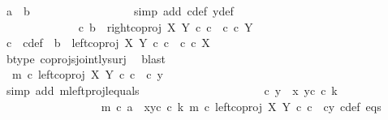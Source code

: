 \begin{isabellebody}
\ {\isachardoublequoteopen}a\ {\isacharequal}{\kern0pt}\ b{\isachardoublequoteclose}\isanewline
\ \ \ \ \ \ \ \ \ \ \ \ \ \ \ \ \isamarkupfalse%
\ {\isacharparenleft}{\kern0pt}simp\ add{\isacharcolon}{\kern0pt}\ c{\isacharunderscore}{\kern0pt}def\ y{\isacharunderscore}{\kern0pt}def{\isacharparenright}{\kern0pt}\isanewline
\ \ \ \ \ \ \ \ \ \ \isamarkupfalse%
\isanewline
\ \ \ \ \ \ \ \ \isamarkupfalse%
\isanewline
\ \ \ \ \ \ \ \ \ \ \ \ \isamarkupfalse%
\ {\isachardoublequoteopen}{\isasymnexists}c{\isachardot}{\kern0pt}\ b\ {\isacharequal}{\kern0pt}\ right{\isacharunderscore}{\kern0pt}coproj\ X\ Y\ {\isasymcirc}\isactrlsub c\ c\ {\isasymand}\ c\ {\isasymin}\isactrlsub c\ Y{\isachardoublequoteclose}\isanewline
\ \ \ \ \ \ \ \ \ \ \ \ \isamarkupfalse%
\ \isamarkupfalse%
\ c\ \ c{\isacharunderscore}{\kern0pt}def{\isacharcolon}{\kern0pt}\ \ {\isachardoublequoteopen}b\ {\isacharequal}{\kern0pt}\ left{\isacharunderscore}{\kern0pt}coproj\ X\ Y\ {\isasymcirc}\isactrlsub c\ c\ {\isasymand}\ c\ {\isasymin}\isactrlsub c\ X{\isachardoublequoteclose}\isanewline
\ \ \ \ \ \ \ \ \ \ \ \ \ \ \isamarkupfalse%
\ b{\isacharunderscore}{\kern0pt}type\ coprojs{\isacharunderscore}{\kern0pt}jointly{\isacharunderscore}{\kern0pt}surj\ \isamarkupfalse%
\ blast\isanewline
\ \ \ \ \ \ \ \ \ \ \ \ \isamarkupfalse%
\ \isamarkupfalse%
\ \ {\isachardoublequoteopen}m\ {\isasymcirc}\isactrlsub c\ left{\isacharunderscore}{\kern0pt}coproj\ X\ Y\ {\isasymcirc}\isactrlsub c\ c\ {\isacharequal}{\kern0pt}\ {\isasymlangle}c{\isacharcomma}{\kern0pt}\ y{}{\isasymrangle}{\isachardoublequoteclose}\isanewline
\ \ \ \ \ \ \ \ \ \ \ \ \ \ \isamarkupfalse%
\ {\isacharparenleft}{\kern0pt}simp\ add{\isacharcolon}{\kern0pt}\ m{\isacharunderscore}{\kern0pt}leftproj{\isacharunderscore}{\kern0pt}l{\isacharunderscore}{\kern0pt}equals{\isacharparenright}{\kern0pt}\ \ \ \ \ \ \isanewline
\ \ \ \ \ \ \ \ \ \ \ \ \isamarkupfalse%
\ \isamarkupfalse%
\ {\isachardoublequoteopen}{\isasymlangle}c{\isacharcomma}{\kern0pt}\ y{}{\isasymrangle}\ {\isacharequal}{\kern0pt}\ {\isasymlangle}x{}{\isacharcomma}{\kern0pt}\ y{}\isactrlsup c\ {\isasymcirc}\isactrlsub c\ k{\isasymrangle}{\isachardoublequoteclose}\isanewline
\ \ \ \ \ \ \ \ \ \ \ \ \ \ \ \ \isamarkupfalse%
\ {\isacartoucheopen}m\ {\isasymcirc}\isactrlsub c\ a\ {\isacharequal}{\kern0pt}\ {\isasymlangle}x{}{\isacharcomma}{\kern0pt}y{}\isactrlsup c\ {\isasymcirc}\isactrlsub c\ k{\isasymrangle}{\isacartoucheclose}\ {\isacartoucheopen}m\ {\isasymcirc}\isactrlsub c\ left{\isacharunderscore}{\kern0pt}coproj\ X\ Y\ {\isasymcirc}\isactrlsub c\ c\ {\isacharequal}{\kern0pt}\ {\isasymlangle}c{\isacharcomma}{\kern0pt}y{}{\isasymrangle}{\isacartoucheclose}\ c{\isacharunderscore}{\kern0pt}def\ eqs\ \isamarkupfalse%

\end{isabellebody}
